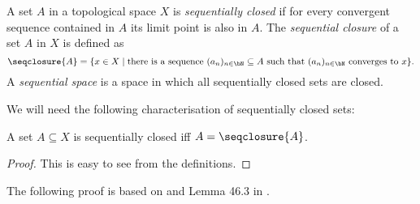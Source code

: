 \begin{defi}
    A set $A$ in a topological space $X$ is \emph{sequentially closed} if for every convergent sequence contained in $A$ its limit point is also in $A$. 
    \href{https://github.com/leanprover-community/mathlib4/blob/93828f4cd10fb8cab31700b110fd2751d36bf1b8/Mathlib/Topology/Defs/Sequences.lean#L53-L57}{\faExternalLink}
    The \emph{sequential closure} of a set $A$ in $X$ is defined as 
    \[\seqclosure{A} = \{ x \in X \mid \text{there is a sequence } (a_n)_{n \in \bN} \subseteq A \text{ such that } (a_n)_{n \in \bN} \text{ converges to } x\}.\]
    \href{https://github.com/leanprover-community/mathlib4/blob/93828f4cd10fb8cab31700b110fd2751d36bf1b8/Mathlib/Topology/Defs/Sequences.lean#L47-L51}{\faExternalLink}
    A \emph{sequential space} is a space in which all sequentially closed sets are closed.
    \href{https://github.com/leanprover-community/mathlib4/blob/93828f4cd10fb8cab31700b110fd2751d36bf1b8/Mathlib/Topology/Defs/Sequences.lean#L87-L90}{\faExternalLink}
\end{defi}

We will need the following characterisation of sequentially closed sets: 

\begin{lem}
    A set $A \subseteq X$ is sequentially closed iff $A = \seqclosure{A}$.
    \href{https://github.com/leanprover-community/mathlib4/blob/93828f4cd10fb8cab31700b110fd2751d36bf1b8/Mathlib/Topology/Sequences.lean#L87-L89}{\faExternalLink}
\end{lem}
\begin{proof}
    This is easy to see from the definitions.
\end{proof}

The following proof is based on \cite{Scott2016} and Lemma 46.3 in \cite{Munkres2014}. 

